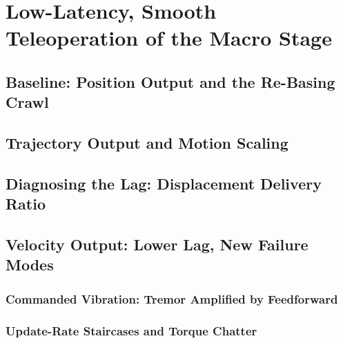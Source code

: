 \chapter{Low-Latency, Smooth Teleoperation of the Macro Stage}
\label{ch:latency}

\section{Baseline: Position Output and the Re-Basing Crawl}
\label{sec:lat-baseline}

\section{Trajectory Output and Motion Scaling}
\label{sec:lat-trajectory}

\section{Diagnosing the Lag: Displacement Delivery Ratio}
\label{sec:lat-delivery}

\section{Velocity Output: Lower Lag, New Failure Modes}
\label{sec:lat-velocity}

\subsection{Commanded Vibration: Tremor Amplified by Feedforward}
\label{sec:lat-tremor}

\subsection{Update-Rate Staircases and Torque Chatter}
\label{sec:lat-chatter}

